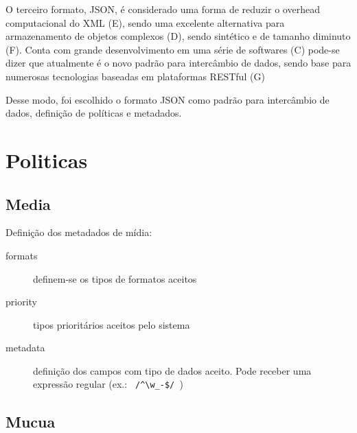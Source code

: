 O terceiro formato, JSON, é considerado uma forma de reduzir o
overhead computacional do XML (E), sendo uma excelente alternativa
para armazenamento de objetos complexos (D), sendo sintético e de
tamanho diminuto (F). Conta com grande desenvolvimento em uma série de
softwares (C) pode-se dizer que atualmente é o novo padrão para
intercâmbio de dados, sendo base para numerosas tecnologias baseadas
em plataformas RESTful (G)

Desse modo, foi escolhido o formato JSON como padrão para intercâmbio
de dados, definição de políticas e metadados.

\section{Politicas}

\subsection{Media}

Definição dos metadados de mídia:
\begin{description}
  \item[formats] definem-se os tipos de formatos aceitos
  \item[priority] tipos prioritários aceitos pelo sistema
  \item[metadata] definição dos campos com tipo de dados aceito. Pode
    receber uma expressão regular (ex.: \verb| /^\w_-$/ |)
\end{description}



\subsection{Mucua}




